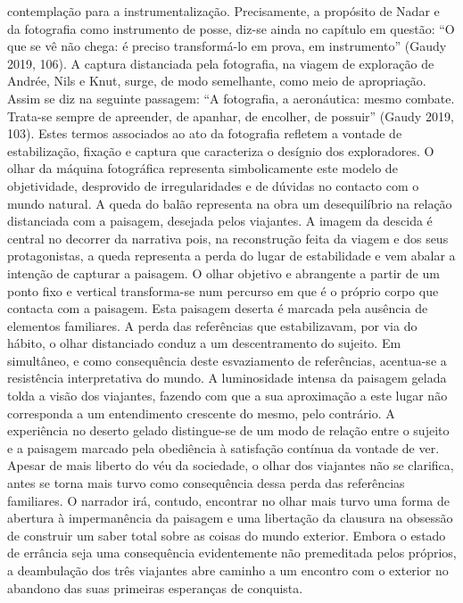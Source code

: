\documentclass{article}
\begin{document}
contemplação para a instrumentalização. Precisamente, a propósito de Nadar e da
fotografia como instrumento de posse, diz-se ainda no capítulo em questão: “O que
se vê não chega: é preciso transformá-lo em prova, em instrumento” (Gaudy 2019,
106). A captura distanciada pela fotografia, na viagem de exploração de Andrée, Nils
e Knut, surge, de modo semelhante, como meio de apropriação. Assim se diz na seguinte passagem: “A fotografia, a aeronáutica: mesmo combate. Trata-se sempre de
apreender, de apanhar, de encolher, de possuir” (Gaudy 2019, 103). Estes termos
associados ao ato da fotografia refletem a vontade de estabilização, fixação e captura
que caracteriza o desígnio dos exploradores. O olhar da máquina fotográfica representa simbolicamente este modelo de objetividade, desprovido de irregularidades e
de dúvidas no contacto com o mundo natural.
A queda do balão representa na obra um desequilíbrio na relação distanciada
com a paisagem, desejada pelos viajantes. A imagem da descida é central no decorrer
da narrativa pois, na reconstrução feita da viagem e dos seus protagonistas, a queda
representa a perda do lugar de estabilidade e vem abalar a intenção de capturar a
paisagem. O olhar objetivo e abrangente a partir de um ponto fixo e vertical transforma-se num percurso em que é o próprio corpo que contacta com a paisagem. Esta
paisagem deserta é marcada pela ausência de elementos familiares. A perda das referências que estabilizavam, por via do hábito, o olhar distanciado conduz a um descentramento do sujeito. Em simultâneo, e como consequência deste esvaziamento de
referências, acentua-se a resistência interpretativa do mundo. A luminosidade intensa da paisagem gelada tolda a visão dos viajantes, fazendo com que a sua aproximação a este lugar não corresponda a um entendimento crescente do mesmo, pelo
contrário. A experiência no deserto gelado distingue-se de um modo de relação entre
o sujeito e a paisagem marcado pela obediência à satisfação contínua da vontade de
ver. Apesar de mais liberto do véu da sociedade, o olhar dos viajantes não se clarifica,
antes se torna mais turvo como consequência dessa perda das referências familiares.
O narrador irá, contudo, encontrar no olhar mais turvo uma forma de abertura à
impermanência da paisagem e uma libertação da clausura na obsessão de construir
um saber total sobre as coisas do mundo exterior. Embora o estado de errância seja
uma consequência evidentemente não premeditada pelos próprios, a deambulação
dos três viajantes abre caminho a um encontro com o exterior no abandono das suas
primeiras esperanças de conquista.
\end{document}
